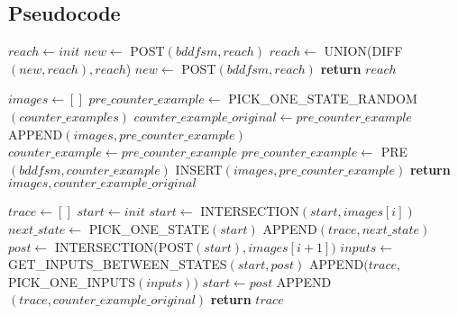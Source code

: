 \begin{appendices}
    \section*{Pseudocode}
        \begin{algorithmic}
            \State $reach\leftarrow init$
            \State $new\leftarrow$ POST$(bddfsm, reach)$
                \State $reach\leftarrow$ UNION(DIFF$(new, reach),reach$)
                \State $new\leftarrow$ POST$(bddfsm, reach)$
            \EndWhile
            \State \textbf{return }$reach$
        \EndFunction
        
        \medskip
        
            \State $images \leftarrow []$
            \State $pre\_counter\_example \leftarrow$ PICK\_ONE\_STATE\_RANDOM$(counter\_examples)$
            \State $counter\_example\_original \leftarrow pre\_counter\_example$
            \State APPEND$(images, pre\_counter\_example)$
                \State $counter\_example \leftarrow pre\_counter\_example$
                \State $pre\_counter\_example \leftarrow$ PRE$(bddfsm, counter\_example)$
                \State INSERT$(images, pre\_counter\_example)$
            \EndWhile
            \State \textbf{return }$images, counter\_example\_original$
        \EndFunction
        
        \medskip
        
            \State $trace \leftarrow []$
            \State $start \leftarrow init$
             
                \State $start \leftarrow$ INTERSECTION$(start, images[i])$
                \State $next\_state \leftarrow$ PICK\_ONE\_STATE$(start)$
                \State APPEND$(trace, next\_state)$
                \State $post \leftarrow$ INTERSECTION(POST$(start), images[i+1])$
                \State $inputs \leftarrow$ GET\_INPUTS\_BETWEEN\_STATES$(start, post)$
                \State APPEND$(trace,$ PICK\_ONE\_INPUTS$(inputs))$
                \State $start \leftarrow post$
            \EndFor
            \State APPEND$(trace, counter\_example\_original)$
            \State \textbf{return }$trace$
        \EndFunction
        

\end{algorithmic}
\end{appendices}
